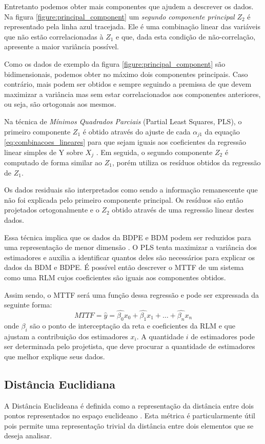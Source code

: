 Entretanto podemos obter mais componentes que ajudem a descrever os dados. Na figura \ref{figure:principal_component} um \textit{segundo componente principal} $Z_2$ é representado pela linha azul tracejada. Ele é uma combinação linear das variáveis que não estão correlacionadas à $Z_1$ e que, dada esta condição de não-correlação, apresente a maior variância possível.

Como os dados de exemplo da figura \ref{figure:principal_component} são bidimensionais, podemos obter no máximo dois componentes principais. Caso contrário, mais podem ser obtidos e sempre seguindo a premissa de que devem maximizar a variância mas sem estar correlacionados aos componentes anteriores, ou seja, são ortogonais aos mesmos.

Na técnica de \textit{Mínimos Quadrados Parciais} (Partial Least Squares, PLS), o primeiro componente $Z_1$ é obtido através do ajuste de cada $\alpha_{j1}$ da equação \ref{eq:combinacoes_lineares} para que sejam iguais aos coeficientes da regressão linear simples de Y sobre $X_j$ \cite{James2013}. Em seguida, o segundo componente $Z_2$ é computado de forma similar ao $Z_1$, porém utiliza os resíduos obtidos da regressão de $Z_1$.

Os dados residuais são interpretados como sendo a informação remanescente que não foi explicada pelo primeiro componente principal. Os resíduos são então projetados ortogonalmente e o $Z_2$ obtido através de uma regressão linear destes dados.

Essa técnica implica que os dados da BDPE e BDM podem ser reduzidos para uma representação de menor dimensão \cite{Maitra2008}. O PLS tenta maximizar a variância dos estimadores e auxilia a identificar quantos deles são necessários para explicar os dados da BDM e BDPE. É possível então descrever o MTTF de um sistema como uma RLM cujos coeficientes são iguais aos componentes obtidos.

Assim sendo, o MTTF será uma função dessa regressão e pode ser expressada da seguinte forma:
\begin{equation}
MTTF = \hat{y}= \hat{\beta_0}x_0+\hat{\beta_1}x_1+\dots+\hat{\beta_n}x_n
\label{eq:MTTF_estimadores}
\end{equation}
onde $\beta_i$ são o ponto de interceptação da reta e coeficientes da RLM e que ajustam a contribuição dos estimadores $x_i$. A quantidade $i$ de estimadores pode ser determinada pelo projetista, que deve procurar a quantidade de estimadores que melhor explique seus dados. 

\subsection{Distância Euclidiana}
\label{subsection_estimativas_euclidiana}
A Distância Euclideana é definida como a representação da distância entre dois pontos representados no espaço euclideano \cite{Deza2009}. Esta métrica é particularmente útil pois permite uma representação trivial da distância entre dois elementos que se deseja analisar.

